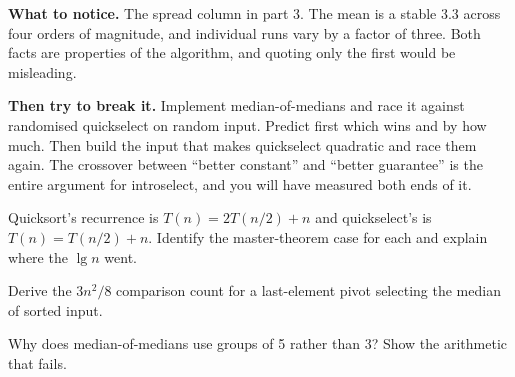 \begin{lab}
\textbf{What to notice.} The spread column in part 3. The mean is a stable 3.3
across four orders of magnitude, and individual runs vary by a factor of three.
Both facts are properties of the algorithm, and quoting only the first would be
misleading.

\smallskip
\textbf{Then try to break it.} Implement median-of-medians and race it against
randomised quickselect on random input. Predict first which wins and by how
much. Then build the input that makes quickselect quadratic and race them
again. The crossover between ``better constant'' and ``better guarantee'' is the
entire argument for introselect, and you will have measured both ends of it.
\end{lab}

\begin{checkpoint}
\begin{tightnum}
  \item Quicksort's recurrence is $T(n)=2T(n/2)+n$ and quickselect's is
        $T(n)=T(n/2)+n$. Identify the master-theorem case for each and explain
        where the $\lg n$ went.
  \item Derive the $3n^{2}/8$ comparison count for a last-element pivot
        selecting the median of sorted input.
  \item Why does median-of-medians use groups of 5 rather than 3? Show the
        arithmetic that fails.
\end{tightnum}
\end{checkpoint}

